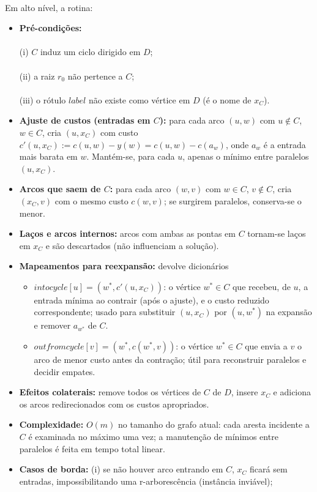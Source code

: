 \documentclass[12pt,a4paper]{article}
\def\texttt#1{#1}%
\def\emph#1{#1}%
\def\_{}%
\begin{document}
\paragraph{} Em alto nível, a rotina:
\begin{itemize}\setlength{\itemsep}{2pt}
    \item \textbf{Pré-condições:} 
    \paragraph{}
    (i) \(C\) induz um ciclo dirigido em \(D\); 
    \paragraph{}
    (ii) a raiz \(r_0\) não pertence a \(C\); 
    \paragraph{}
    (iii) o rótulo \(\texttt{label}\) não existe como vértice em \(D\) (é o nome de \(x_C\)).
    \item \textbf{Ajuste de custos (entradas em \(C\)):} para cada arco \((u,w)\) com \(u\notin C\), \(w\in C\), cria \((u, x_C)\) com custo \(c'(u,x_C) := c(u,w) - y(w) = c(u,w) - c(a_w)\), onde \(a_w\) é a entrada mais barata em \(w\). Mantém-se, para cada \(u\), apenas o mínimo entre paralelos \((u, x_C)\).
    \item \textbf{Arcos que saem de \(C\):} para cada arco \((w,v)\) com \(w\in C\), \(v\notin C\), cria \((x_C, v)\) com o \emph{mesmo} custo \(c(w,v)\); se surgirem paralelos, conserva-se o menor.
    \item \textbf{Laços e arcos internos:} arcos com ambas as pontas em \(C\) tornam-se laços em \(x_C\) e são descartados (não influenciam a solução). 
    \item \textbf{Mapeamentos para reexpansão:} devolve dicionários
    \begin{itemize}\setlength{\itemsep}{1pt}
        \item \(\texttt{in\_to\_cycle}[u] = (w^*, c'(u,x_C))\): o vértice \(w^*\in C\) que recebeu, de \(u\), a entrada mínima ao contrair (após o ajuste), e o custo reduzido correspondente; usado para substituir \((u,x_C)\) por \((u,w^*)\) na expansão e remover \(a_{w^*}\) de \(C\).
        \item \(\texttt{out\_from\_cycle}[v] = (w^*, c(w^*,v))\): o vértice \(w^*\in C\) que envia a \(v\) o arco de menor custo antes da contração; útil para reconstruir paralelos e decidir empates.
    \end{itemize}
    \item \textbf{Efeitos colaterais:} remove todos os vértices de \(C\) de \(D\), insere \(x_C\) e adiciona os arcos redirecionados com os custos apropriados.
    \item \textbf{Complexidade:} \(O(m)\) no tamanho do grafo atual: cada aresta incidente a \(C\) é examinada no máximo uma vez; a manutenção de mínimos entre paralelos é feita em tempo total linear.
    \item \textbf{Casos de borda:} 
    (i) se não houver arco entrando em \(C\), \(x_C\) ficará sem entradas, impossibilitando uma r-arborescência (instância inviável); 

\end{itemize}
\end{document}
